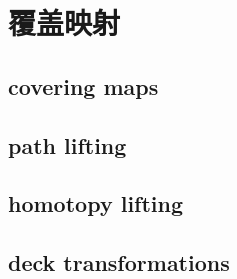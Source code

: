 \section{覆盖映射}
\label{b3:sec:1101}


\subsection{covering maps}
\label{b3:subsec:110101}

\subsection{path lifting}
\label{b3:subsec:110102}

\subsection{homotopy lifting}
\label{b3:subsec:110103}

\subsection{deck transformations}
\label{b3:subsec:110104}


